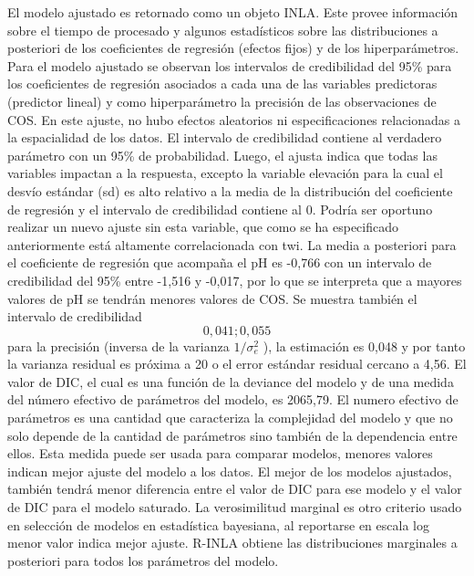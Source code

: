 \documentclass[11pt,b5paper,]{krantz}
\begin{document}
El modelo ajustado es retornado como un objeto INLA. Este provee
información sobre el tiempo de procesado y algunos estadísticos sobre
las distribuciones a posteriori de los coeficientes de regresión
(efectos fijos) y de los hiperparámetros. Para el modelo ajustado se
observan los intervalos de credibilidad del 95\% para los coeficientes
de regresión asociados a cada una de las variables predictoras
(predictor lineal) y como hiperparámetro la precisión de las
observaciones de COS. En este ajuste, no hubo efectos aleatorios ni
especificaciones relacionadas a la espacialidad de los datos. El
intervalo de credibilidad contiene al verdadero parámetro con un 95\% de
probabilidad. Luego, el ajusta indica que todas las variables impactan a
la respuesta, excepto la variable elevación para la cual el desvío
estándar (sd) es alto relativo a la media de la distribución del
coeficiente de regresión y el intervalo de credibilidad contiene al 0.
Podría ser oportuno realizar un nuevo ajuste sin esta variable, que como
se ha especificado anteriormente está altamente correlacionada con twi.
La media a posteriori para el coeficiente de regresión que acompaña el
pH es -0,766 con un intervalo de credibilidad del 95\% entre -1,516 y
-0,017, por lo que se interpreta que a mayores valores de pH se tendrán
menores valores de COS. Se muestra también el intervalo de credibilidad
\[0,041; 0,055\] para la precisión (inversa de la varianza
\(1/\sigma_e^2\) ), la estimación es 0,048 y por tanto la varianza
residual es próxima a 20 o el error estándar residual cercano a 4,56. El
valor de DIC, el cual es una función de la deviance del modelo y de una
medida del número efectivo de parámetros del modelo, es 2065,79. El
numero efectivo de parámetros es una cantidad que caracteriza la
complejidad del modelo y que no solo depende de la cantidad de
parámetros sino también de la dependencia entre ellos. Esta medida puede
ser usada para comparar modelos, menores valores indican mejor ajuste
del modelo a los datos. El mejor de los modelos ajustados, también
tendrá menor diferencia entre el valor de DIC para ese modelo y el valor
de DIC para el modelo saturado. La verosimilitud marginal es otro
criterio usado en selección de modelos en estadística bayesiana, al
reportarse en escala log menor valor indica mejor ajuste. R-INLA obtiene
las distribuciones marginales a posteriori para todos los parámetros del
modelo.
\end{document}
